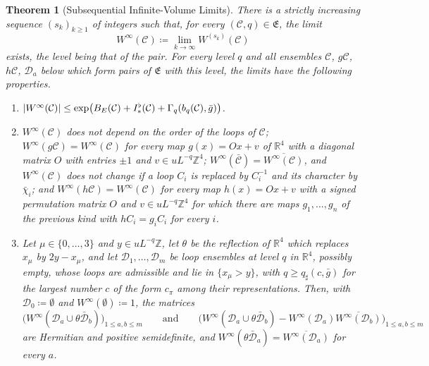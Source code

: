\documentclass[11pt]{preprint}
\DeclarePairedDelimiter{\abs}{\lvert}{\rvert}
\numberwithin{equation}{section}
\newtheorem{theorem}{Theorem}[section]
\theoremstyle{definition}
\theoremstyle{remark}
\theoremstyle{plain}
\begin{document}
\begin{theorem}[Subsequential Infinite-Volume Limits]\label{thm:infinite-volume}
There is a strictly increasing sequence $(s_k)_{k \geq 1}$ of integers such that, for every $(\mathcal C, q) \in \mathfrak E$, the limit
\begin{equation}\label{eq:infinite-volume-limit}
    W^\infty(\mathcal C) \coloneqq \lim_{k \to \infty}W^{(s_k)}(\mathcal C)
\end{equation}
exists, the level being that of the pair. For every level $q$ and all ensembles $\mathcal C$, $g\mathcal C$, $h\mathcal C$, $\mathcal D_a$ below which form pairs of $\mathfrak E$ with this level, the limits have the following properties.
\begin{enumerate}[label=(\roman*)]
\item $\abs{W^\infty(\mathcal C)} \leq \exp\bigl(B_E(\mathcal C) + I^\flat_*(\mathcal C) + \Gamma_q(b_q(\mathcal C), \bar g)\bigr)$.
\item $W^\infty(\mathcal C)$ does not depend on the order of the loops of $\mathcal C$; $W^\infty(g\mathcal C) = W^\infty(\mathcal C)$ for every map $g(x) = Ox + v$ of $\mathbb R^4$ with a diagonal matrix $O$ with entries $\pm1$ and $v \in uL^{-q}\mathbb Z^4$; $W^\infty(\bar{\mathcal C}) = \overline{W^\infty(\mathcal C)}$, and $W^\infty(\mathcal C)$ does not change if a loop $C_i$ is replaced by $C_i^{-1}$ and its character by $\bar\chi_i$; and $W^\infty(h\mathcal C) = W^\infty(\mathcal C)$ for every map $h(x) = Ox + v$ with a signed permutation matrix $O$ and $v \in uL^{-q}\mathbb Z^4$ for which there are maps $g_1, \dots, g_n$ of the previous kind with $hC_i = g_iC_i$ for every $i$.
\item Let $\mu \in \{ 0, \dots, 3 \}$ and $y \in uL^{-q}\mathbb Z$, let $\theta$ be the reflection of $\mathbb R^4$ which replaces $x_\mu$ by $2y - x_\mu$, and let $\mathcal D_1, \dots, \mathcal D_m$ be loop ensembles at level $q$ in $\mathbb R^4$, possibly empty, whose loops are admissible and lie in $\{ x_\mu > y \}$, with $q \geq q_\sharp(c, \bar g)$ for the largest number $c$ of the form $c_\pi$ among their representations. Then, with $\mathcal D_0 \coloneqq \emptyset$ and $W^\infty(\emptyset) \coloneqq 1$, the matrices
\begin{equation}\label{eq:infinite-volume-positivity}
    \bigl(W^\infty(\mathcal D_a \cup \theta\bar{\mathcal D}_b)\bigr)_{1 \leq a, b \leq m}
    \qquad\text{and}\qquad
    \bigl(W^\infty(\mathcal D_a \cup \theta\bar{\mathcal D}_b) - W^\infty(\mathcal D_a)\overline{W^\infty(\mathcal D_b)}\bigr)_{1 \leq a, b \leq m}
\end{equation}
are Hermitian and positive semidefinite, and $W^\infty(\theta\bar{\mathcal D}_a) = \overline{W^\infty(\mathcal D_a)}$ for every $a$.
\end{enumerate}
\end{theorem}
\end{document}
